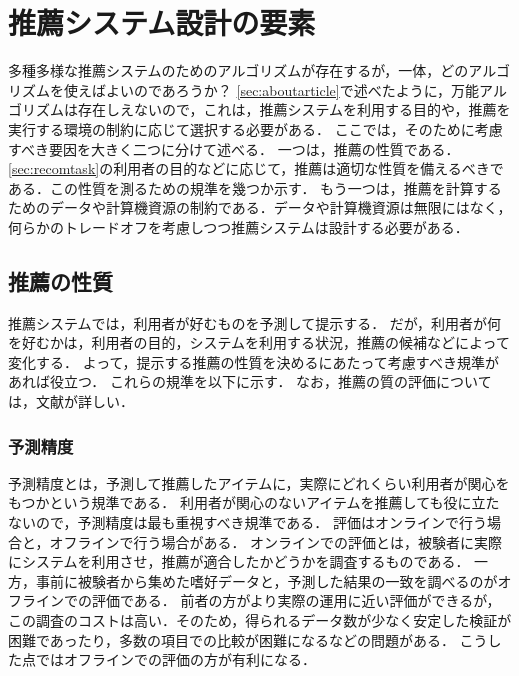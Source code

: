 \chapter{推薦システム設計の要素}
\label{sec:design}

多種多様な推薦システムのためのアルゴリズムが存在するが，一体，どのアルゴリズムを使えばよいのであろうか？
\ref{sec:aboutarticle}で述べたように，万能アルゴリズムは存在しえないので，これは，推薦システムを利用する目的や，推薦を実行する環境の制約に応じて選択する必要がある．
ここでは，そのために考慮すべき要因を大きく二つに分けて述べる．
一つは，推薦の性質である．\ref{sec:recomtask}の利用者の目的などに応じて，推薦は適切な性質を備えるべきである．この性質を測るための規準を幾つか示す．
もう一つは，推薦を計算するためのデータや計算機資源の制約である．データや計算機資源は無限にはなく，何らかのトレードオフを考慮しつつ推薦システムは設計する必要がある．

\section{推薦の性質}
\label{sec:recomtype}

推薦システムでは，利用者が好むものを予測して提示する．
だが，利用者が何を好むかは，利用者の目的，システムを利用する状況，推薦の候補などによって変化する．
よって，提示する推薦の性質を決めるにあたって考慮すべき規準があれば役立つ．
これらの規準を以下に示す．
なお，推薦の質の評価については，文献\cite{jacm:04:01,jmlr:09:01}が詳しい．

\subsection{予測精度}
\label{sec:prederr}


予測精度とは，予測して推薦したアイテムに，実際にどれくらい利用者が関心をもつかという規準である．
利用者が関心のないアイテムを推薦しても役に立たないので，予測精度は最も重視すべき規準である\cite{sigir:01:01}．
評価はオンラインで行う場合と，オフラインで行う場合がある．
オンラインでの評価とは，被験者に実際にシステムを利用させ，推薦が適合したかどうかを調査するものである．
一方，事前に被験者から集めた嗜好データと，予測した結果の一致を調べるのがオフラインでの評価である．
前者の方がより実際の運用に近い評価ができるが，この調査のコストは高い．そのため，得られるデータ数が少なく安定した検証が困難であったり，多数の項目での比較が困難になるなどの問題がある．
こうした点ではオフラインでの評価の方が有利になる．

